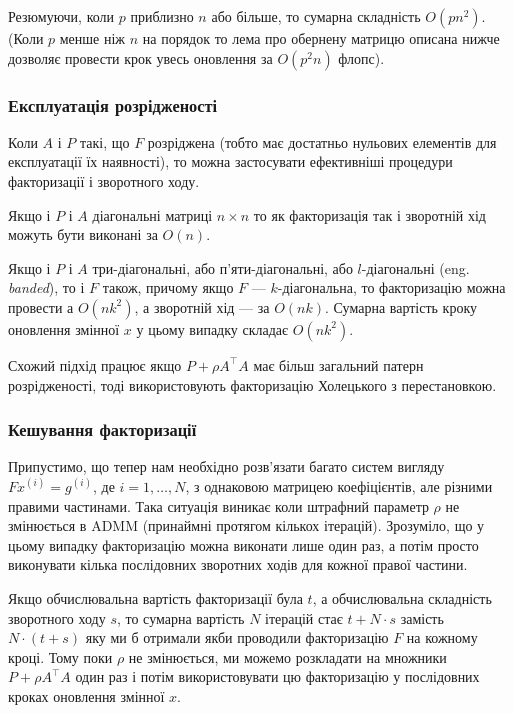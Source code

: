 Резюмуючи, коли $p$ приблизно $n$ або більше, то сумарна складність $O\left(p n^2\right)$. \quad (Коли $p$ менше ніж $n$ на порядок то лема про обернену матрицю описана нижче дозволяє провести крок увесь оновлення за $O\left(p^2 n\right)$ флопс).

\subsubsection{Експлуатація розрідженості}

Коли $A$ і $P$ такі, що $F$ розріджена (тобто має достатньо нульових елементів для експлуатації їх наявності), то можна застосувати ефективніші процедури факторизації і зворотного ходу.

\begin{example}
    Якщо і $P$ і $A$ діагональні матриці $n \times n$ то як факторизація так і зворотній хід можуть бути виконані за $O(n)$.
\end{example}

\begin{example}
    Якщо і $P$ і $A$ три-діагональні, або п'яти-діагональні, або $l$-діагональні (eng. \textit{banded}), то і $F$ також, причому якщо $F$ --- $k$-діагональна, то факторизацію можна провести а $O\left(nk^2\right)$, а зворотній хід --- за $O(nk)$. Сумарна вартість кроку оновлення змінної $x$ у цьому випадку складає $O\left(nk^2\right)$.
\end{example}

\begin{remark}
    Схожий підхід працює якщо $P + \rho A^\intercal A$ має більш загальний патерн розрідженості, тоді використовують факторизацію Холецького з перестановкою.
\end{remark}

\subsubsection{Кешування факторизації}

Припустимо, що тепер нам необхідно розв'язати багато систем вигляду $F x^{(i)} = g^{(i)}$, де $i = 1, \ldots, N$, з однаковою матрицею коефіцієнтів, але різними правими частинами. Така ситуація виникає коли штрафний параметр $\rho$ не змінюється в ADMM (принаймні протягом кількох  ітерацій). Зрозуміло, що у цьому випадку факторизацію можна виконати лише один раз, а потім просто виконувати кілька послідовних зворотних ходів для кожної правої частини. \medskip

Якщо обчислювальна вартість факторизації була $t$, а обчислювальна складність зворотного ходу $s$, то сумарна вартість $N$ ітерацій стає $t + N \cdot s$ замість $N \cdot (t + s)$ яку ми б отримали якби проводили факторизацію $F$ на кожному кроці. Тому поки $\rho$ не змінюється, ми можемо  розкладати на множники $P + \rho A^\intercal A$ один раз і потім використовувати цю факторизацію у послідовних кроках оновлення змінної $x$. 


